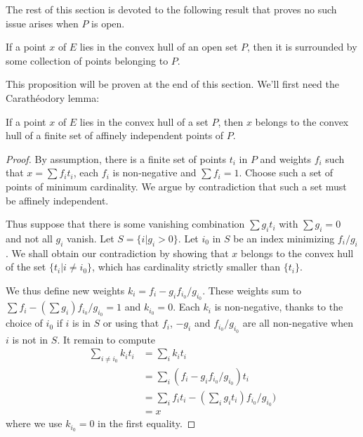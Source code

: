 The rest of this section is devoted to the following result that proves no such issue arises
when $P$ is open.

\begin{proposition}
  \label{prop:surrounded_by_open}
  \leanok
  If a point $x$ of $E$ lies in the convex hull of an open set $P$,
  then it is surrounded by some collection of points belonging to $P$.
\end{proposition}

This proposition will be proven at the end of this section.
We'll first need the Carathéodory lemma:

\begin{lemma}
\label{lem:caratheodory}
\leanok
  If a point $x$ of $E$ lies in the convex hull of a set $P$, then $x$
  belongs to the convex hull of a finite set of affinely independent points
  of $P$.
\end{lemma}

\begin{proof}
  \leanok
  By assumption, there is a finite set of points $t_i$ in $P$ and
  weights $f_i$ such that $x = \sum f_i t_i$, each $f_i$ is non-negative
  and $\sum f_i = 1$.
  Choose such a set of points of minimum cardinality. We argue by
  contradiction that such a set must be affinely independent.

  Thus suppose that there is some vanishing combination $\sum g_i t_i$ with
  $\sum g_i = 0$ and not all $g_i$ vanish.
  Let $S = \{i | g_i > 0\}$.
  Let $i_0$ in $S$ be an index minimizing $f_i/g_i$. We shall obtain our
  contradiction by showing that $x$ belongs to the convex hull of the set
  $\{t_i| i \ne i_0\}$, which has cardinality strictly smaller than
  $\{t_i\}$.

  We thus define new weights $k_i = f_i - g_i f_{i_0}/g_{i_0}$.
  These weights sum to $\sum f_i - (\sum g_i)f_{i_0}/g_{i_0} = 1$
  and $k_{i_0} = 0$.
  Each $k_i$ is non-negative, thanks to the choice of $i_0$ if
  $i$ is in $S$ or using that $f_i$, $-g_i$ and $f_{i_0}/g_{i_0}$
  are all non-negative when $i$ is not in $S$.
  It remain to compute
  \begin{align*}
    \sum_{i ≠ i_0} k_i t_i &= \sum_i k_i t_i \\
      &= \sum_i (f_i - g_i f_{i_0}/g_{i_0}) t_i  \\
      &= \sum_i f_i t_i - \left(\sum_i g_i t_i\right)f_{i_0}/g_{i_0})   \\
      &= x
  \end{align*}
  where we use $k_{i_0} = 0$ in the first equality.
\end{proof}



